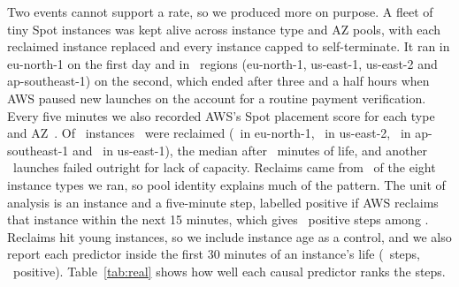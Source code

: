 \documentclass{article}
\begin{document}
Two events cannot support a rate, so we produced more on purpose. A fleet of tiny Spot instances was kept alive across instance type and AZ pools, with each reclaimed instance replaced and every instance capped to self-terminate. It ran in eu-north-1 on the first day and in \realNRegions\ regions (eu-north-1, us-east-1, us-east-2 and ap-southeast-1) on the second, which ended after three and a half hours when AWS paused new launches on the account for a routine payment verification. Every five minutes we also recorded AWS's Spot placement score for each type and AZ~\citep{aws-placement}. Of \realInstances\ instances \realReclaimed\ were reclaimed (\realReclEuNorth\ in eu-north-1, \realReclUsEastTwo\ in us-east-2, \realReclApSoutheast\ in ap-southeast-1 and \realReclUsEastOne\ in us-east-1), the median after \realMedianMin\ minutes of life, and another \realCapFail\ launches failed outright for lack of capacity. Reclaims came from \realTypesReclaimed\ of the eight instance types we ran, so pool identity explains much of the pattern. The unit of analysis is an instance and a five-minute step, labelled positive if AWS reclaims that instance within the next 15 minutes, which gives \realPosSteps\ positive steps among \realSteps. Reclaims hit young instances, so we include instance age as a control, and we also report each predictor inside the first 30 minutes of an instance's life (\realYoungSteps\ steps, \realYoungPos\ positive). Table~\ref{tab:real} shows how well each causal predictor ranks the steps.

\begin{table}[t]
  \centering
  \caption{AUROC for anticipating a real reclaim within 15 minutes, with a 95\% interval resampled by whole hours, and the same restricted to the first 30 minutes of an instance's life. The last row is not causal and asks whether the price-spike proxy coincides with real reclaims.}
  \label{tab:real}
  \small
  
\end{table}
\end{document}
